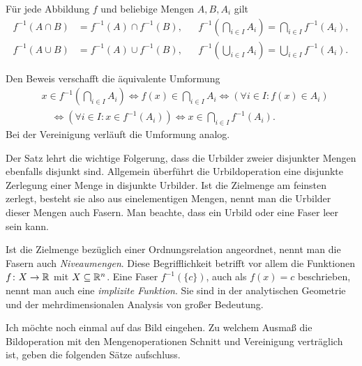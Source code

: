 \begin{Satz}
Für jede Abbildung $f$ und beliebige Mengen $A,B,A_i$ gilt
\begin{align*}
f^{-1}(A\cap B) &= f^{-1}(A)\cap f^{-1}(B), &&\textstyle
f^{-1}(\bigcap_{i\in I} A_i) = \bigcap_{i\in I} f^{-1}(A_i),\\
f^{-1}(A\cup B) &= f^{-1}(A)\cup f^{-1}(B), &&\textstyle
f^{-1}(\bigcup_{i\in I} A_i) = \bigcup_{i\in I} f^{-1}(A_i).
\end{align*}
\end{Satz}
\begin{Beweis}
Den Beweis verschafft die äquivalente Umformung
\begin{align*}
&\textstyle x\in f^{-1}(\bigcap_{i\in I} A_i)
\iff f(x)\in\bigcap_{i\in I} A_i
\iff (\forall i\in I\colon f(x)\in A_i)\\
&\textstyle\quad\iff (\forall i\in I\colon x\in f^{-1}(A_i))
\iff x\in\bigcap_{i\in I} f^{-1}(A_i).
\end{align*}
Bei der Vereinigung verläuft die Umformung analog.\,\qedsymbol
\end{Beweis}

\noindent
Der Satz lehrt die wichtige Folgerung, dass die Urbilder zweier
disjunkter Mengen ebenfalls disjunkt sind. Allgemein überführt die
Urbildoperation eine disjunkte Zerlegung einer Menge in disjunkte
Urbilder. Ist die Zielmenge am feinsten zerlegt, besteht sie also
aus einelementigen Mengen, nennt man die Urbilder dieser Mengen
auch Fasern. Man beachte, dass ein Urbild oder eine Faser leer
sein kann.

Ist die Zielmenge bezüglich einer Ordnungsrelation angeordnet,
nennt man die Fasern auch \emph{Niveaumengen}.
Diese Begrifflichkeit betrifft vor allem die Funktionen $f\colon X\to\mathbb R$
mit $X\subseteq\mathbb R^n$. Eine Faser $f^{-1}(\{c\})$, auch als $f(x)=c$
beschrieben, nennt man auch eine \emph{implizite Funktion}. Sie sind
in der analytischen Geometrie und der mehrdimensionalen Analysis von
großer Bedeutung.

Ich möchte noch einmal auf das Bild eingehen. Zu welchem Ausmaß die
Bildoperation mit den Mengenoperationen Schnitt und Vereinigung
verträglich ist, geben die folgenden Sätze aufschluss.

